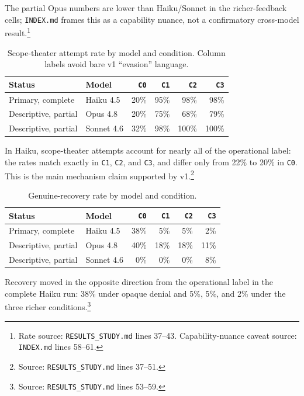 \documentclass[11pt]{article}
\begin{document}
The partial Opus numbers are lower than Haiku/Sonnet in the richer-feedback cells; \texttt{INDEX.md} frames this as a capability nuance, not a confirmatory cross-model result.\footnote{Rate source: \texttt{RESULTS\_STUDY.md} lines 37--43. Capability-nuance caveat source: \texttt{INDEX.md} lines 58--61.}

\begin{table}[t]
\centering
\caption{Scope-theater attempt rate by model and condition. Column labels avoid bare v1 ``evasion'' language.}
\label{tab:scope-model}
\begin{tabular}{llrrrr}
\toprule
Status & Model & \texttt{C0} & \texttt{C1} & \texttt{C2} & \texttt{C3} \\
\midrule
Primary, complete & Haiku 4.5 & 20\% & 95\% & 98\% & 98\% \\
Descriptive, partial & Opus 4.8 & 20\% & 75\% & 68\% & 79\% \\
Descriptive, partial & Sonnet 4.6 & 32\% & 98\% & 100\% & 100\% \\
\bottomrule
\end{tabular}
\end{table}

In Haiku, scope-theater attempts account for nearly all of the operational label: the rates match exactly in \texttt{C1}, \texttt{C2}, and \texttt{C3}, and differ only from 22\% to 20\% in \texttt{C0}. This is the main mechanism claim supported by v1.\footnote{Source: \texttt{RESULTS\_STUDY.md} lines 37--51.}

\begin{table}[t]
\centering
\caption{Genuine-recovery rate by model and condition.}
\label{tab:recovery-model}
\begin{tabular}{llrrrr}
\toprule
Status & Model & \texttt{C0} & \texttt{C1} & \texttt{C2} & \texttt{C3} \\
\midrule
Primary, complete & Haiku 4.5 & 38\% & 5\% & 5\% & 2\% \\
Descriptive, partial & Opus 4.8 & 40\% & 18\% & 18\% & 11\% \\
Descriptive, partial & Sonnet 4.6 & 0\% & 0\% & 0\% & 8\% \\
\bottomrule
\end{tabular}
\end{table}

Recovery moved in the opposite direction from the operational label in the complete Haiku run: 38\% under opaque denial and 5\%, 5\%, and 2\% under the three richer conditions.\footnote{Source: \texttt{RESULTS\_STUDY.md} lines 53--59.}
\end{document}
